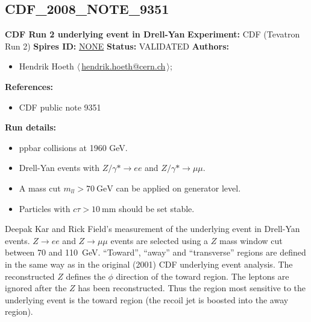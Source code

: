 \subsection{CDF\_2008\_NOTE\_9351}
\textbf{CDF Run 2 underlying event in Drell-Yan}\newline
\textbf{Experiment:} CDF (Tevatron Run 2) \newline
\textbf{Spires ID:} \href{http://www.slac.stanford.edu/spires/find/hep/www?rawcmd=key+NONE}{NONE}\newline
\textbf{Status:} VALIDATED\newline
\textbf{Authors:}
\begin{itemize}
  \item Hendrik Hoeth $\langle\,$\href{mailto:hendrik.hoeth@cern.ch}{hendrik.hoeth@cern.ch}$\,\rangle$;
\end{itemize}
\textbf{References:}
\begin{itemize}
  \item CDF public note 9351
\end{itemize}
\textbf{Run details:}
\begin{itemize}

  \item ppbar collisions at 1960 GeV.
  \item Drell-Yan events with $Z/\gamma* \ensuremath{\to} e e$ and $Z/\gamma* \ensuremath{\to} \mu\mu$.
  \item A mass cut $m_{ll} > 70~\text{GeV}$ can be applied on generator level.
  \item Particles with $c \tau > 10~\text{mm}$ should be set stable.\end{itemize}

\noindent Deepak Kar and Rick Field's measurement of the underlying event in Drell-Yan events. $Z \ensuremath{\to} ee$ and $Z \ensuremath{\to} \mu\mu$ events are selected using a $Z$ mass window cut between 70 and 110~GeV. ``Toward'', ``away'' and ``transverse'' regions are defined in the same way as in the original (2001) CDF underlying event analysis. The reconstructed $Z$ defines the $\phi$ direction of the toward region. The leptons are ignored after the $Z$ has been reconstructed. Thus the region most sensitive to the underlying event is the toward region (the recoil jet is boosted into the away region).

\clearpage


\clearpage

